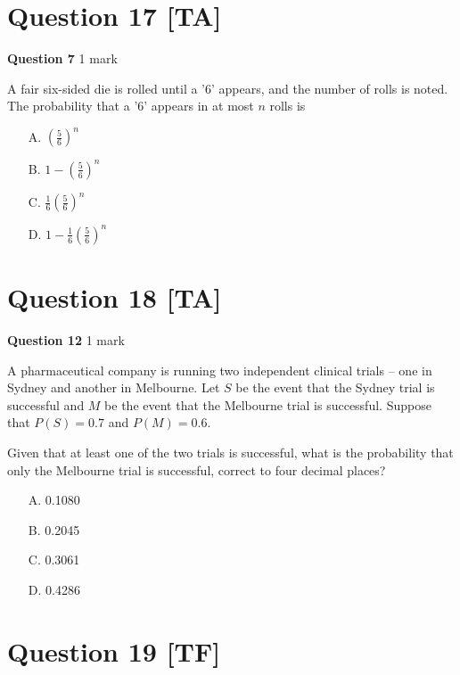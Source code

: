\documentclass[12pt,a4paper]{article}
\begin{document}
\section*{Question 17 [TA]}

\textbf{Question 7} \hfill 1 mark

A fair six-sided die is rolled until a '6' appears, and the number of rolls is noted. The probability that a '6' appears in at most $n$ rolls is

\begin{enumerate}
    \item[A.] $\left(\frac{5}{6}\right)^n$
    \item[B.] $1 - \left(\frac{5}{6}\right)^n$
    \item[C.] $\frac{1}{6}\left(\frac{5}{6}\right)^n$
    \item[D.] $1 - \frac{1}{6}\left(\frac{5}{6}\right)^n$
\end{enumerate}

\vspace{5\baselineskip}

\hrulefill

\section*{Question 18 [TA]}

\textbf{Question 12} \hfill 1 mark

A pharmaceutical company is running two independent clinical trials -- one in Sydney and another in Melbourne. Let $S$ be the event that the Sydney trial is successful and $M$ be the event that the Melbourne trial is successful. Suppose that $P(S) = 0.7$ and $P(M) = 0.6$.

Given that at least one of the two trials is successful, what is the probability that only the Melbourne trial is successful, correct to four decimal places?

\begin{enumerate}
    \item[A.] 0.1080
    \item[B.] 0.2045
    \item[C.] 0.3061
    \item[D.] 0.4286
\end{enumerate}

\vspace{5\baselineskip}

\section*{Question 19 [TF]}
\end{document}
